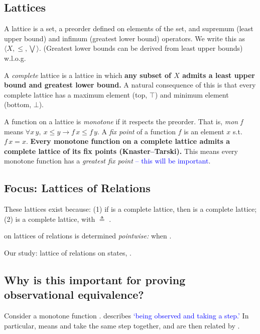 \subsection{Lattices}

A lattice is a set, a preorder defined on elements of the set, and supremum
(least upper bound) and infimum (greatest lower bound) operators. We write this
as $\langle X, \leqslant, \bigvee \rangle$. (Greatest lower bounds can be
derived from least upper bounds) w.l.o.g.

A \emph{complete} lattice is a lattice in which \textbf{any subset of $X$ admits
a least upper bound and greatest lower bound.} A natural consequence of this is
that every complete lattice has a maximum element (top, $\top$) and minimum
element (bottom, $\bot$).

A function on a lattice is \emph{monotone} if it respects the preorder. That is,
\emph{mon f} means $\forall x\, y,\ x \leqslant y \to f\,x \leqslant f\,y$. A
\emph{fix point} of a function $f$ is an element $x$ s.t. $f\,x = x$.
\textbf{Every monotone function on a complete lattice admits a complete lattice
of its fix points (Knaster--Tarski).} This means every monotone function has a
\emph{greatest fix point} \textcolor{blue}{-- this will be important}.

\subsection{Focus: Lattices of Relations}

These lattices exist because: (1) if  is a complete lattice, then
 is a complete lattice; (2)  is a complete lattice, with
\code{<=} $\triangleq$ \code{->}.

\code{<=} on lattices of relations is determined \emph{pointwise:} 
when .

Our study: lattice of relations on states, .

\subsection{Why is this important for proving observational equivalence?}

Consider a monotone function . 
describes \textcolor{blue}{`being observed and taking a step.'} In particular,
 means  and  take the same step together, and
are then related by .

